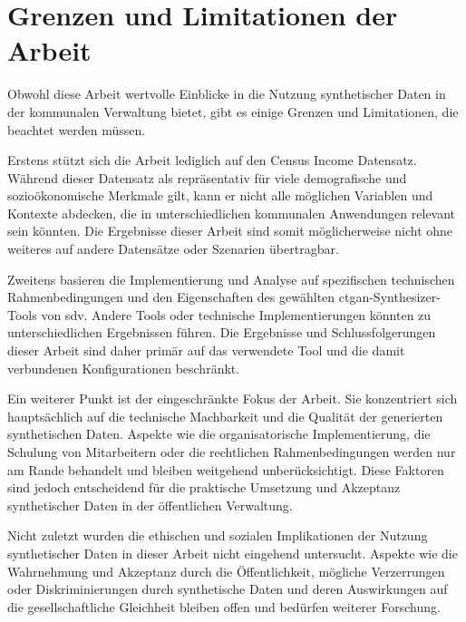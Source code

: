 \section{Grenzen und Limitationen der Arbeit}
\begin{spacing}{1.5}

Obwohl diese Arbeit wertvolle Einblicke in die Nutzung synthetischer Daten in der kommunalen Verwaltung bietet, gibt es einige Grenzen und Limitationen, die beachtet werden müssen.

Erstens stützt sich die Arbeit lediglich auf den Census Income Datensatz. Während dieser Datensatz als repräsentativ für viele demografische und sozioökonomische Merkmale gilt, kann er nicht alle möglichen Variablen und Kontexte abdecken, die in unterschiedlichen kommunalen Anwendungen relevant sein könnten. Die Ergebnisse dieser Arbeit sind somit möglicherweise nicht ohne weiteres auf andere Datensätze oder Szenarien übertragbar.

Zweitens basieren die Implementierung und Analyse auf spezifischen technischen Rahmenbedingungen und den Eigenschaften des gewählten \acrshort{ctgan}-Synthesizer-Tools von \acrshort{sdv}. Andere Tools oder technische Implementierungen könnten zu unterschiedlichen Ergebnissen führen. Die Ergebnisse und Schlussfolgerungen dieser Arbeit sind daher primär auf das verwendete Tool und die damit verbundenen Konfigurationen beschränkt.

Ein weiterer Punkt ist der eingeschränkte Fokus der Arbeit. Sie konzentriert sich hauptsächlich auf die technische Machbarkeit und die Qualität der generierten synthetischen Daten. Aspekte wie die organisatorische Implementierung, die Schulung von Mitarbeitern oder die rechtlichen Rahmenbedingungen werden nur am Rande behandelt und bleiben weitgehend unberücksichtigt. Diese Faktoren sind jedoch entscheidend für die praktische Umsetzung und Akzeptanz synthetischer Daten in der öffentlichen Verwaltung.

Nicht zuletzt wurden die ethischen und sozialen Implikationen der Nutzung synthetischer Daten in dieser Arbeit nicht eingehend untersucht. Aspekte wie die Wahrnehmung und Akzeptanz durch die Öffentlichkeit, mögliche Verzerrungen oder Diskriminierungen durch synthetische Daten und deren Auswirkungen auf die gesellschaftliche Gleichheit bleiben offen und bedürfen weiterer Forschung.

\end{spacing}